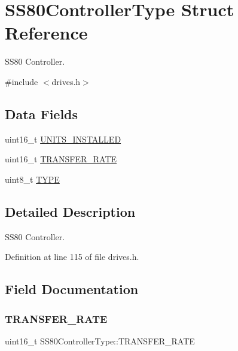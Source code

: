 \hypertarget{structSS80ControllerType}{}\section{S\+S80\+Controller\+Type Struct Reference}
\label{structSS80ControllerType}


S\+S80 Controller.  




{\ttfamily \#include $<$drives.\+h$>$}

\subsection*{Data Fields}
\begin{DoxyCompactItemize}
\item 
uint16\+\_\+t \hyperlink{structSS80ControllerType_a0868c32b362ef2af2ac64fa16aee8aae}{U\+N\+I\+T\+S\+\_\+\+I\+N\+S\+T\+A\+L\+L\+ED}
\item 
uint16\+\_\+t \hyperlink{structSS80ControllerType_a98a3f1a7de63398531426b5781cb0090}{T\+R\+A\+N\+S\+F\+E\+R\+\_\+\+R\+A\+TE}
\item 
uint8\+\_\+t \hyperlink{structSS80ControllerType_a255739680bca0ad3b4d1346cf5017332}{T\+Y\+PE}
\end{DoxyCompactItemize}


\subsection{Detailed Description}
S\+S80 Controller. 

Definition at line 115 of file drives.\+h.



\subsection{Field Documentation}
\mbox{\label{structSS80ControllerType_a98a3f1a7de63398531426b5781cb0090}} 
\subsubsection{\texorpdfstring{T\+R\+A\+N\+S\+F\+E\+R\+\_\+\+R\+A\+TE}{TRANSFER\_RATE}}
{\footnotesize\ttfamily uint16\+\_\+t S\+S80\+Controller\+Type\+::\+T\+R\+A\+N\+S\+F\+E\+R\+\_\+\+R\+A\+TE}




